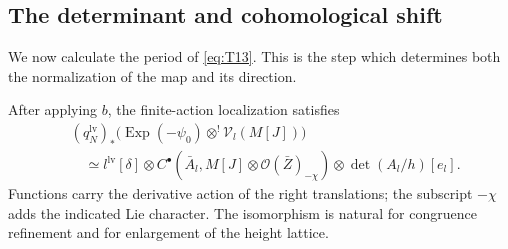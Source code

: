 \subsection{The determinant and cohomological shift}

We now calculate the period of \eqref{eq:T13}.  This is the step
which determines both the normalization of the map and its direction.

\begin{lemma}\label{lem:unipotent-finite-period}
After applying $b$, the finite-action localization satisfies
\begin{equation}\label{eq:T14}
 \begin{aligned}
 &(q_N^{\mathrm{lv}})_*
   \bigl(\operatorname{Exp}(-\psi_0)
                 \otimes^!\mathcal V_l(M[J])\bigr)\\
 &\quad\simeq l^{\mathrm{lv}}[\delta]\otimes
 C^\bullet\!\left(\bar A_l,
    M[J]\otimes\mathcal O(\bar Z)_{-\chi}\right)
       \otimes\det(A_l/h)[e_l].
 \end{aligned}
\end{equation}
Functions carry the derivative action of the right translations;
the subscript $-\chi$ adds the indicated Lie character.  The
isomorphism is natural for congruence refinement and for enlargement
of the height lattice.
\end{lemma}

